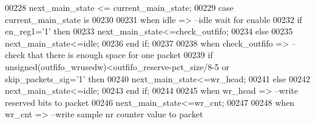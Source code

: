 \begin{DoxyCode}
00228     \textcolor{vhdlchar}{next_main_state} \textcolor{vhdlchar}{<=} \textcolor{vhdlchar}{current_main_state};
00229     \textcolor{keywordflow}{case} \textcolor{vhdlchar}{current_main_state} \textcolor{keywordflow}{is}
00230     
00231         \textcolor{keywordflow}{when} \textcolor{vhdlchar}{idle} \textcolor{vhdlchar}{=}\textcolor{vhdlchar}{>}\textcolor{keyword}{            --idle wait for enable}
00232             \textcolor{keywordflow}{if} \textcolor{vhdlchar}{en_reg1}\textcolor{vhdlchar}{=}\textcolor{vhdlchar}{'}\textcolor{vhdllogic}{}\textcolor{vhdllogic}{1}\textcolor{vhdlchar}{'} \textcolor{keywordflow}{then} 
00233                 \textcolor{vhdlchar}{next_main_state}\textcolor{vhdlchar}{<=}\textcolor{vhdlchar}{check\_outfifo};
00234             \textcolor{keywordflow}{else}
00235                 \textcolor{vhdlchar}{next_main_state}\textcolor{vhdlchar}{<=}\textcolor{vhdlchar}{idle};
00236             \textcolor{keywordflow}{end} \textcolor{keywordflow}{if};
00237         
00238         \textcolor{keywordflow}{when} \textcolor{vhdlchar}{check\_outfifo} \textcolor{vhdlchar}{=}\textcolor{vhdlchar}{>}\textcolor{keyword}{ --check that there is enough space for one packet }
00239             \textcolor{keywordflow}{if} \textcolor{comment}{unsigned}\textcolor{vhdlchar}{(}\textcolor{vhdlchar}{outfifo_wrusedw}\textcolor{vhdlchar}{)}\textcolor{vhdlchar}{<}\textcolor{vhdlchar}{outfifo_reserve}\textcolor{vhdlchar}{-}\textcolor{vhdlchar}{pct_size}\textcolor{vhdlchar}{/}\textcolor{vhdllogic}{8-5} \textcolor{keywordflow}{or} \textcolor{vhdlchar}{
      skip_packets_sig}\textcolor{vhdlchar}{=}\textcolor{vhdlchar}{'}\textcolor{vhdllogic}{}\textcolor{vhdllogic}{1}\textcolor{vhdlchar}{'} \textcolor{keywordflow}{then}
00240                 \textcolor{vhdlchar}{next_main_state}\textcolor{vhdlchar}{<=}\textcolor{vhdlchar}{wr\_head}; 
00241             \textcolor{keywordflow}{else}
00242                 \textcolor{vhdlchar}{next_main_state}\textcolor{vhdlchar}{<=}\textcolor{vhdlchar}{idle};
00243             \textcolor{keywordflow}{end} \textcolor{keywordflow}{if};
00244       
00245         \textcolor{keywordflow}{when} \textcolor{vhdlchar}{wr\_head} \textcolor{vhdlchar}{=}\textcolor{vhdlchar}{>}\textcolor{keyword}{       --write reserved bits to packet         }
00246             \textcolor{vhdlchar}{next_main_state}\textcolor{vhdlchar}{<=}\textcolor{vhdlchar}{wr\_cnt};
00247           
00248         \textcolor{keywordflow}{when} \textcolor{vhdlchar}{wr\_cnt} \textcolor{vhdlchar}{=}\textcolor{vhdlchar}{>}\textcolor{keyword}{        --write sample nr counter value to packet          }

\end{DoxyCode}
